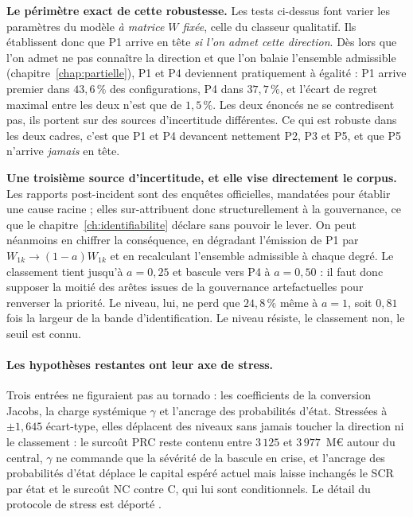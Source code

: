 \begin{attention}
\textbf{Le périmètre exact de cette robustesse.} Les tests ci-dessus font
varier les paramètres du modèle \emph{à matrice $W$ fixée}, celle du classeur qualitatif. Ils
établissent donc que P1 arrive en tête \emph{si l'on admet cette direction}. Dès lors que l'on
admet ne pas connaître la direction et que l'on balaie l'ensemble admissible
(chapitre~\ref{chap:partielle}), P1 et P4 deviennent pratiquement à égalité : P1 arrive
premier dans $43{,}6\,\%$ des configurations, P4 dans $37{,}7\,\%$, et l'écart de regret maximal entre
les deux n'est que de $1{,}5\,\%$. Les deux énoncés ne se contredisent pas, ils portent sur des
sources d'incertitude différentes. Ce qui est robuste dans les deux cadres, c'est que P1 et P4
devancent nettement P2, P3 et P5, et que P5 n'arrive \emph{jamais} en tête.

\medskip
\noindent\textbf{Une troisième source d'incertitude, et elle vise directement le corpus.} Les
rapports post-incident sont des enquêtes officielles, mandatées pour établir une cause racine ;
elles sur-attribuent donc structurellement à la gouvernance, ce que le
chapitre~\ref{ch:identifiabilite} déclare sans pouvoir le lever. On peut néanmoins en chiffrer la
conséquence, en dégradant l'émission de P1 par $W_{1k}\to(1-a)W_{1k}$ et en recalculant l'ensemble
admissible à chaque degré. Le classement tient jusqu'à $a=0{,}25$ et bascule vers P4 à
$a=0{,}50$ : il faut donc supposer la moitié des arêtes issues de la gouvernance
artefactuelles pour renverser la priorité. Le niveau, lui, ne perd que $24{,}8\,\%$ même à
$a=1$, soit $0{,}81$ fois la largeur de la bande d'identification. Le niveau résiste, le
classement non, le seuil est connu.
\end{attention}

\paragraph{Les hypothèses restantes ont leur axe de stress.} Trois entrées ne figuraient pas au
tornado : les coefficients de la conversion Jacobs, la charge systémique $\gamma$ et l'ancrage
des probabilités d'état. Stressées à $\pm 1{,}645$ écart-type, elles déplacent des niveaux sans
jamais toucher la direction ni le classement : le surcoût PRC reste contenu entre $3\,125$ et
$3\,977$~M\euro{} autour du central, $\gamma$ ne commande que la sévérité de la bascule en
crise, et l'ancrage des probabilités d'état déplace le capital espéré actuel mais laisse
inchangés le SCR par état et le surcoût NC contre C, qui lui sont conditionnels. Le détail du
protocole de stress est déporté \matcomp.

